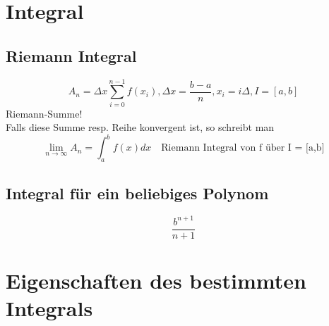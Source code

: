 \section{Integral}
\subsection{Riemann Integral}
\[ \boxed{A_n = \Delta x \sum_{i=0}^{n-1} f(x_i) 
, \Delta x = \frac{b - a}{n} , x_i = i \Delta , I = [a,b]} \]
Riemann-Summe! \\
Falls diese Summe resp. Reihe konvergent ist, so schreibt man
\[ \boxed{\lim_{n \rightarrow \infty} A_n = \int_{a}^{b} f(x) d x \quad \text{Riemann Integral von f über I = [a,b]} } \]

\subsection{Integral für ein beliebiges Polynom}
\[ \boxed{\frac{b^{n + 1}}{n + 1}} \]

\section{Eigenschaften des bestimmten Integrals}
